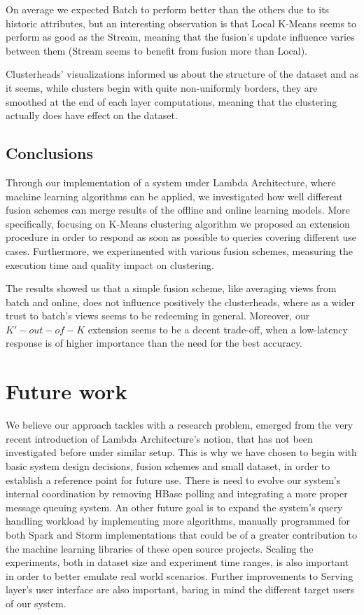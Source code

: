 \documentclass{lmproj}
\begin{document}
On average we expected Batch to perform better than the others due to its historic attributes, but an interesting observation is that Local K-Means seems to perform as good as the Stream, meaning that the fusion's update influence varies between them (Stream seems to benefit from fusion more than Local).

Clusterheads' visualizations informed us about the structure of the dataset and as it seems, while clusters begin with quite non-uniformly borders, they are smoothed at the end of each layer computations, meaning that the clustering actually does have effect on the dataset. 

\section{Conclusions}
\label{conclusions}

Through our implementation of a system under Lambda Architecture, where machine learning algorithms can be applied, we investigated how well different fusion schemes can merge results of the offline and online learning models. More specifically, focusing on K-Means clustering algorithm we proposed an extension procedure in order to respond as soon as possible to queries covering different use cases. Furthermore, we experimented with various fusion schemes, measuring the execution time and quality impact on clustering. 

The results showed us that a simple fusion scheme, like averaging views from batch and online, does not influence positively the clusterheads, where as a wider trust to batch's views seems to be redeeming in general. Moreover, our $K'-out-of-K$ extension seems to be a decent trade-off, when a low-latency response is of higher importance than the need for the best accuracy.



\chapter{Future work}
\label{future_work}

We believe our approach tackles with a research problem, emerged from the very recent introduction of Lambda Architecture's notion, that has not been investigated before under similar setup. This is why we have chosen to begin with basic system design decisions, fusion schemes and small dataset, in order to establish a reference point for future use. There is need to evolve our system's internal coordination by removing HBase polling and integrating a more proper message queuing system. An other future goal is to expand the system's query handling workload by implementing more algorithms, manually programmed for both Spark and Storm implementations that could be of a greater contribution to the machine learning libraries of these open source projects. Scaling the experiments, both in dataset size and experiment time ranges, is also important in order to better emulate real world scenarios. Further improvements to Serving layer's user interface are also important, baring in mind the different target users of our system.




\nocite{*}
\end{document}
